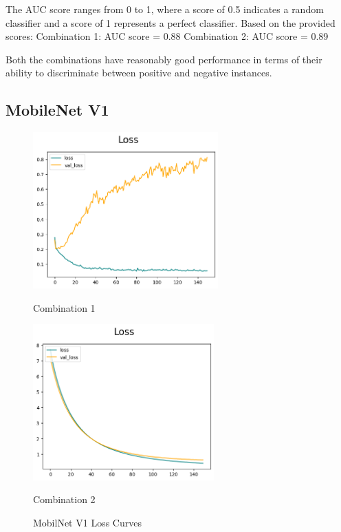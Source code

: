 The AUC score ranges from 0 to 1, where a score of 0.5 indicates a random classifier and a score of 1 represents a perfect classifier. Based on the provided scores: \newline
Combination 1: AUC score = 0.88 \newline
Combination 2: AUC score = 0.89 \newline

Both the combinations have reasonably good performance in terms of their ability to discriminate between positive and negative instances.



\subsection{MobileNet V1}


\begin{figure}[H]
    \centering
    \begin{minipage}[b]{0.49\textwidth}
        \centering
        \includegraphics[width=\textwidth, height=6cm]{Figures/unbalanced_data/without bn/mn1/loss.png}
        \captionsetup{labelformat=empty}
        \caption{Combination 1}
        \label{fig:u_wo_r_l}
    \end{minipage}
    \hfill
    \begin{minipage}[b]{0.49\textwidth}
        \centering
        \includegraphics[width=\textwidth, height=6cm]{Figures/unbalanced_data/with bn/mn1/loss.png}
        \captionsetup{labelformat=empty}
        \caption{Combination 2}
        \label{fig:u_w_r_l}
    \end{minipage}
    \captionsetup{labelformat=default}
    \caption{MobilNet V1 Loss Curves}
\end{figure}


